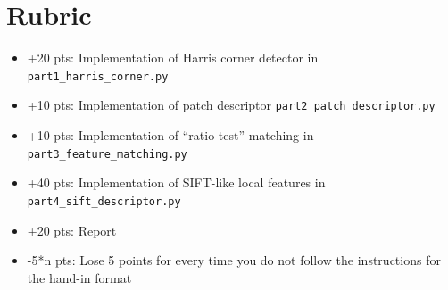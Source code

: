 \documentclass{article}
\begin{document}
\section*{Rubric}
\begin{itemize}
    \item{+20 pts: Implementation of Harris corner detector in \lstinline{part1_harris_corner.py}}
    \item{+10 pts: Implementation of patch descriptor \lstinline{part2_patch_descriptor.py}}
    \item{+10 pts: Implementation of ``ratio test'' matching in \lstinline{part3_feature_matching.py}}
    \item{+40 pts: Implementation of SIFT-like local features in \lstinline{part4_sift_descriptor.py}}
    \item{+20 pts: Report}
    \item{-5*n pts: Lose 5 points for every time you do not follow the instructions for the hand-in format}
\end{itemize}

\end{document}

